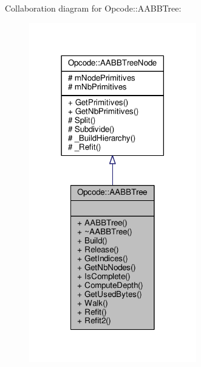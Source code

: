 Collaboration diagram for Opcode\+:\+:A\+A\+B\+B\+Tree\+:
\nopagebreak
\begin{figure}[H]
\begin{center}
\leavevmode
\includegraphics[width=206pt]{de/d20/classOpcode_1_1AABBTree__coll__graph}
\end{center}
\end{figure}

